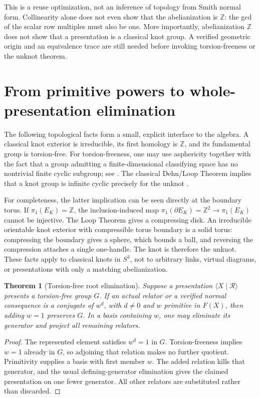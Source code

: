 \documentclass[11pt,letterpaper]{article}
\newtheorem{theorem}{Theorem}[section]
\theoremstyle{definition}
\newcommand{\Z}{\mathbb Z}
\begin{document}
This is a reuse optimization, not an inference of topology from Smith normal
form. Collinearity alone does not even show that the abelianization is
$\Z$: the gcd of the scalar row multiples must also be one. More importantly,
abelianization $\Z$ does not show that a presentation is a classical knot
group. A verified geometric origin and an equivalence trace are still needed
before invoking torsion-freeness or the unknot theorem.

\section{From primitive powers to whole-presentation elimination}
\label{sec:groups}
The following topological facts form a small, explicit interface to the
algebra. A classical knot exterior is irreducible, its first homology is
$\Z$, and its fundamental group is torsion-free. For torsion-freeness, one
may use asphericity together with the fact that a group admitting a
finite-dimensional classifying space has no nontrivial finite cyclic
subgroup; see \cite[(C.1)--(C.2)]{AFW}. The classical Dehn/Loop Theorem implies
that a knot group is infinite cyclic precisely for the unknot
\cite{Papakyriakopoulos}.

For completeness, the latter implication can be seen directly at the
boundary torus. If $\pi_1(E_K)=\Z$, the inclusion-induced map
$\pi_1(\partial E_K)=\Z^2\to\pi_1(E_K)$ cannot be injective. The Loop Theorem
gives a compressing disk. An irreducible orientable knot exterior with
compressible torus boundary is a solid torus: compressing the boundary gives
a sphere, which bounds a ball, and reversing the compression attaches a
single one-handle. The knot is therefore the unknot. These facts apply to
classical knots in $S^3$, not to arbitrary links, virtual diagrams, or
presentations with only a matching abelianization.

\begin{theorem}[Torsion-free root elimination]
\label{thm:rootkill}
Suppose a presentation $\langle X\mid\mathcal R\rangle$ presents a torsion-free
group $G$. If an actual relator or a verified normal consequence is a conjugate
of $w^d$, with $d\ne0$ and $w$ primitive in $F(X)$, then adding $w=1$ preserves
$G$. In a basis containing $w$, one may eliminate its generator and project
\emph{all} remaining relators.
\end{theorem}
\begin{proof}
The represented element satisfies $w^d=1$ in $G$. Torsion-freeness implies
$w=1$ already in $G$, so adjoining that relation makes no further quotient.
Primitivity supplies a basis with first member $w$. The added relation kills
that generator, and the usual defining-generator elimination gives the
claimed presentation on one fewer generator. All other relators are
substituted rather than discarded.
\end{proof}
\end{document}
